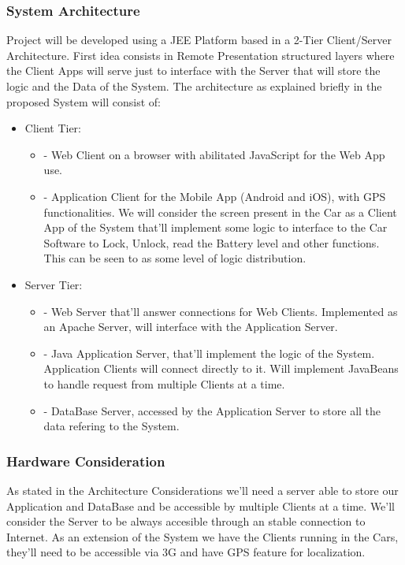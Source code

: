 \documentclass[a4paper]{article}
\begin{document}
\subsubsection{System Architecture}
Project will be developed using a JEE Platform based in a 2-Tier Client/Server Architecture. First idea consists in Remote Presentation structured layers where the Client Apps will serve just to interface with the Server that will store the logic and the Data of the System. The architecture as explained briefly in the proposed System will consist of:
\begin {itemize}
\item Client Tier: 
\begin {itemize}
\item [-]Web Client on a browser with abilitated JavaScript for the Web App use. 
\item [-]Application Client for the Mobile App (Android and iOS), with GPS functionalities. We will consider the screen present in the Car as a Client App of the System that'll implement some logic to interface to the Car Software to Lock, Unlock, read the Battery level and other functions. This can be seen to as some level of logic distribution.
\end{itemize}
\item Server Tier:
\begin {itemize}
\item [-]Web Server that'll answer connections for Web Clients. Implemented as an Apache Server, will interface with the Application Server.
\item [-]Java Application Server, that'll implement the logic of the System. Application Clients will connect directly to it. Will implement JavaBeans to handle request from multiple Clients at a time.
\item [-]DataBase Server, accessed by the Application Server to store all the data refering to the System.
\end{itemize}
\end{itemize}

\subsubsection{Hardware Consideration}
As stated in the Architecture Considerations we'll need a server able to store our Application and DataBase and be accessible by multiple Clients at a time. We'll consider the Server to be always accesible through an stable connection to Internet. 
As an extension of the System we have the Clients running in the Cars, they'll need to be accessible via 3G and have GPS feature for localization.
\end{document}
